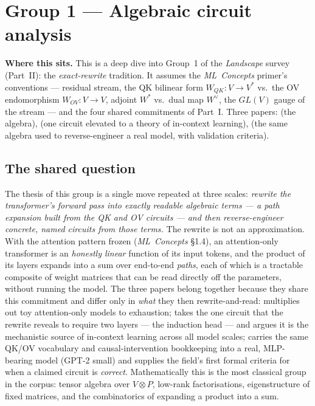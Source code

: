 


\section*{Group 1 --- Algebraic circuit analysis}

\begin{callout}
\textbf{Where this sits.} This is a deep dive into Group~1 of the \emph{Landscape} survey (Part~II): the \emph{exact-rewrite} tradition. It assumes the \emph{ML~Concepts} primer's conventions --- residual stream, the QK bilinear form $W_{QK}:V\to V^{*}$ vs.\ the OV endomorphism $W_{OV}:V\to V$, adjoint $W^{*}$ vs.\ dual map $W^{\vee}$, the $GL(V)$ gauge of the stream --- and the four shared commitments of Part~I. Three papers: \textcite{framework} (the algebra), \textcite{induction-heads} (one circuit elevated to a theory of in-context learning), \textcite{interpretability-in-the-wild-ioi} (the same algebra used to reverse-engineer a real model, with validation criteria).
\end{callout}

\subsection*{The shared question}

The thesis of this group is a single move repeated at three scales: \emph{rewrite the transformer's forward pass into exactly readable algebraic terms --- a path expansion built from the QK and OV circuits --- and then reverse-engineer concrete, named circuits from those terms.} The rewrite is not an approximation. With the attention pattern frozen (\emph{ML~Concepts} \S1.4), an attention-only transformer is an \emph{honestly linear} function of its input tokens, and the product of its layers expands into a sum over end-to-end \emph{paths}, each of which is a tractable composite of weight matrices that can be read directly off the parameters, without running the model. The three papers belong together because they share this commitment and differ only in \emph{what} they then rewrite-and-read: \textcite{framework} multiplies out toy attention-only models to exhaustion; \textcite{induction-heads} takes the one circuit that the rewrite reveals to require two layers --- the induction head --- and argues it is the mechanistic source of in-context learning across all model scales; \textcite{interpretability-in-the-wild-ioi} carries the same QK/OV vocabulary and causal-intervention bookkeeping into a real, MLP-bearing model (GPT-2 small) and supplies the field's first formal criteria for when a claimed circuit is \emph{correct}. Mathematically this is the most classical group in the corpus: tensor algebra over $V\otimes P$, low-rank factorisations, eigenstructure of fixed matrices, and the combinatorics of expanding a product into a sum.

